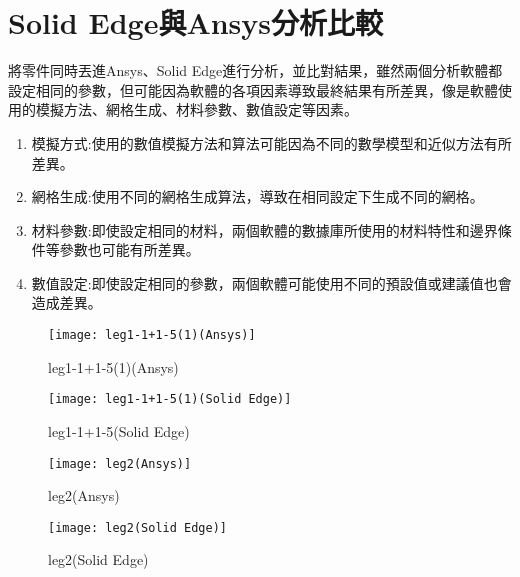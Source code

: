 \section{Solid Edge與Ansys分析比較}
將零件同時丟進Ansys、Solid Edge進行分析，並比對結果，雖然兩個分析軟體都設定相同的參數，但可能因為軟體的各項因素導致最終結果有所差異，像是軟體使用的模擬方法、網格生成、材料參數、數值設定等因素。\
\begin{enumerate}
\item 模擬方式:使用的數值模擬方法和算法可能因為不同的數學模型和近似方法有所差異。
\item 網格生成:使用不同的網格生成算法，導致在相同設定下生成不同的網格。
\item 材料參數:即使設定相同的材料，兩個軟體的數據庫所使用的材料特性和邊界條件等參數也可能有所差異。
\item	數值設定:即使設定相同的參數，兩個軟體可能使用不同的預設值或建議值也會造成差異。
\end{enumerate}
\newpage
\begin{figure}[htbp]
  \centering
  \begin{minipage}{0.45\textwidth}
    \centering
    \texttt{[image: leg1-1+1-5(1)(Ansys)]}
    \caption{leg1-1+1-5(1)(Ansys)}
    \label{leg1-1+1-5(1)(Ansys)}
  \end{minipage}
  \hfill
  \begin{minipage}{0.45\textwidth}
    \centering
    \texttt{[image: leg1-1+1-5(1)(Solid Edge)]}
    \caption{leg1-1+1-5(Solid Edge)}
    \label{leg1-1+1-5(1)(Solid Edge)}
  \end{minipage}
  
  \vspace{0.75cm} %
  
  \begin{minipage}{0.45\textwidth}
    \centering
    \texttt{[image: leg2(Ansys)]}
    \caption{leg2(Ansys)}
    \label{leg2(Ansys)}
  \end{minipage}
  \hfill
  \begin{minipage}{0.45\textwidth}
    \centering
    \texttt{[image: leg2(Solid Edge)]}
    \caption{leg2(Solid Edge)}
    \label{leg2(Solid Edge)}
  \end{minipage}
\end{figure}
\newpage

